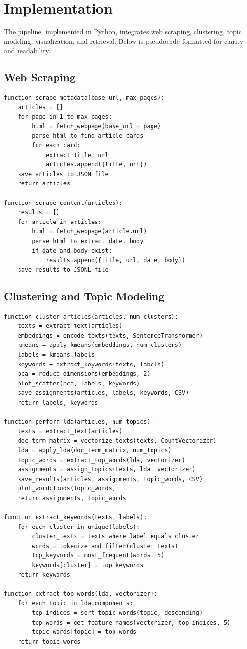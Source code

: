 \documentclass[conference]{IEEEtran}
\begin{document}
\section{Implementation}
The pipeline, implemented in Python, integrates web scraping, clustering, topic modeling, visualization, and retrieval. Below is pseudocode formatted for clarity and readability.

\subsection{Web Scraping}
\begin{lstlisting}
function scrape_metadata(base_url, max_pages):
    articles = []
    for page in 1 to max_pages:
        html = fetch_webpage(base_url + page)
        parse html to find article cards
        for each card:
            extract title, url
            articles.append({title, url})
    save articles to JSON file
    return articles

function scrape_content(articles):
    results = []
    for article in articles:
        html = fetch_webpage(article.url)
        parse html to extract date, body
        if date and body exist:
            results.append({title, url, date, body})
    save results to JSONL file
\end{lstlisting}

\subsection{Clustering and Topic Modeling}
\begin{lstlisting}
function cluster_articles(articles, num_clusters):
    texts = extract_text(articles)
    embeddings = encode_texts(texts, SentenceTransformer)
    kmeans = apply_kmeans(embeddings, num_clusters)
    labels = kmeans.labels
    keywords = extract_keywords(texts, labels)
    pca = reduce_dimensions(embeddings, 2)
    plot_scatter(pca, labels, keywords)
    save_assignments(articles, labels, keywords, CSV)
    return labels, keywords

function perform_lda(articles, num_topics):
    texts = extract_text(articles)
    doc_term_matrix = vectorize_texts(texts, CountVectorizer)
    lda = apply_lda(doc_term_matrix, num_topics)
    topic_words = extract_top_words(lda, vectorizer)
    assignments = assign_topics(texts, lda, vectorizer)
    save_results(articles, assignments, topic_words, CSV)
    plot_wordclouds(topic_words)
    return assignments, topic_words

function extract_keywords(texts, labels):
    for each cluster in unique(labels):
        cluster_texts = texts where label equals cluster
        words = tokenize_and_filter(cluster_texts)
        top_keywords = most_frequent(words, 5)
        keywords[cluster] = top_keywords
    return keywords

function extract_top_words(lda, vectorizer):
    for each topic in lda.components:
        top_indices = sort_topic_words(topic, descending)
        top_words = get_feature_names(vectorizer, top_indices, 5)
        topic_words[topic] = top_words
    return topic_words
\end{lstlisting}
\end{document}
